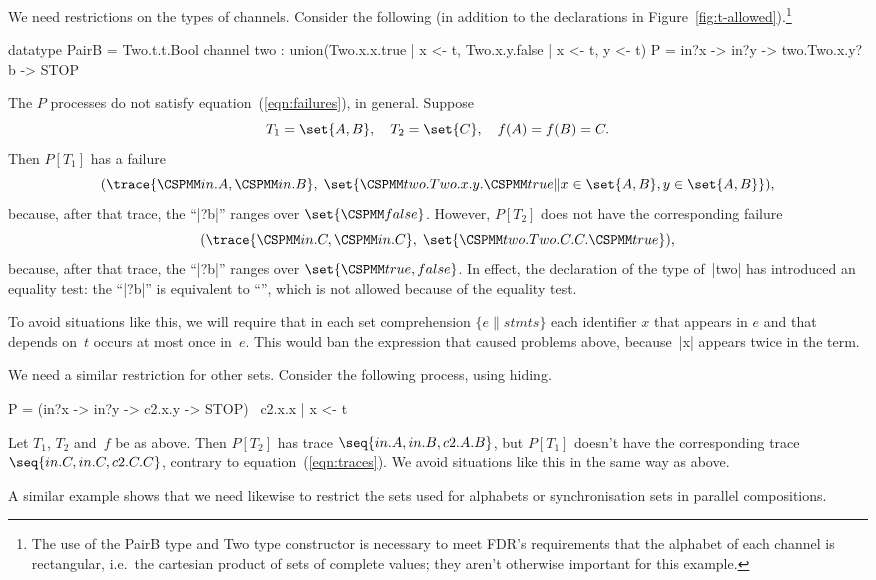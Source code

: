 We need restrictions on the types of channels.  Consider the following (in
addition to the declarations in Figure~\ref{fig:t-allowed}).\footnote{The use
  of the {\cspmfont PairB} type and {\cspmfont Two} type constructor is
  necessary to meet FDR's requirements that the alphabet of each channel is
  rectangular, i.e.~the cartesian product of sets of complete values; they
  aren't otherwise important for this example.}
\begin{cspm}
datatype PairB = Two.t.t.Bool
channel two : union({Two.x.x.true | x <- t}, {Two.x.y.false | x <- t, y <- t})
P = in?x -> in?y -> two.Two.x.y?b -> STOP
\end{cspm}
%
The $P$ processes do not satisfy equation~(\ref{eqn:failures}), in general.
Suppose 
\[
T_1 = \set{A,B}, \quad T_2 = \set{C}, \quad f(A) = f(B) =  C.
\]
Then $P[T_1]$ has a failure
\[
(\trace{\M{in}.A, \M{in}.B},\; 
  \set{\M{two.Two}.x.y.\M{true} \| x \in \set{A,B}, y \in \set{A,B}}),
\]
because, after that trace, the ``|?b|'' ranges over $\set{\M{false}}$.  
However,  $P[T_2]$ does not have the corresponding failure
\[
(\trace{\M{in}.C, \M{in}.C},\; \set{\M{two.Two}.C.C.\M{true}}),
\]
because, after that trace, the ``|?b|'' ranges over $\set{\M{true,false}}$.
In effect, the declaration of the type of~|two| has introduced an equality
test: the ``|?b|'' is equivalent to 
``'', which is not
allowed because of the equality test. 

To avoid situations like this, we will require that in each set
comprehension $\{ e \| stmts\}$ each  identifier $x$ that appears in $e$ and
that depends on~$t$ occurs at most once in~$e$.   This would ban the
expression  that caused problems above,
because~|x| appears twice in the term.

We need a similar restriction for other sets.  Consider the following process,
using hiding. 
\begin{cspm}
P = (in?x -> in?y -> c2.x.y -> STOP) \ {c2.x.x | x <- t}
\end{cspm}
Let $T_1$, $T_2$ and~$f$ be as above.  Then $P[T_2]$ has trace $\seq{in.A,
in.B, c2.A.B}$, but $P[T_1]$ doesn't have the corresponding trace $\seq{in.C,
in.C, c2.C.C}$, contrary to equation~(\ref{eqn:traces}).  We avoid situations
like this in the same way as above.

A similar example shows that we need likewise to restrict the sets used for
alphabets or synchronisation sets in parallel compositions.



